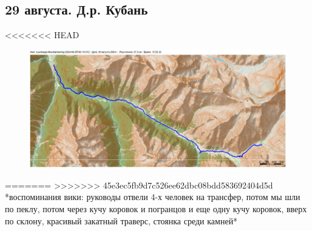 \subsection{29 августа. Д.р. Кубань}
<<<<<<< HEAD


\begin{figure}[h!]
	\centering
	\includegraphics[angle=0, width=0.3\linewidth]{../pics/mini_maps/29}
	\label{fig:mini_29}
\end{figure}

=======
>>>>>>> 45e3ec5fb9d7c526ee62dbc08bdd583692404d5d
*воспоминания вики: руководы отвели 4-х человек на трансфер, потом мы шли по пеклу, потом через кучу коровок и погранцов и еще одну кучу коровок, вверх по склону, красивый закатный траверс, стоянка среди камней*
\newpage